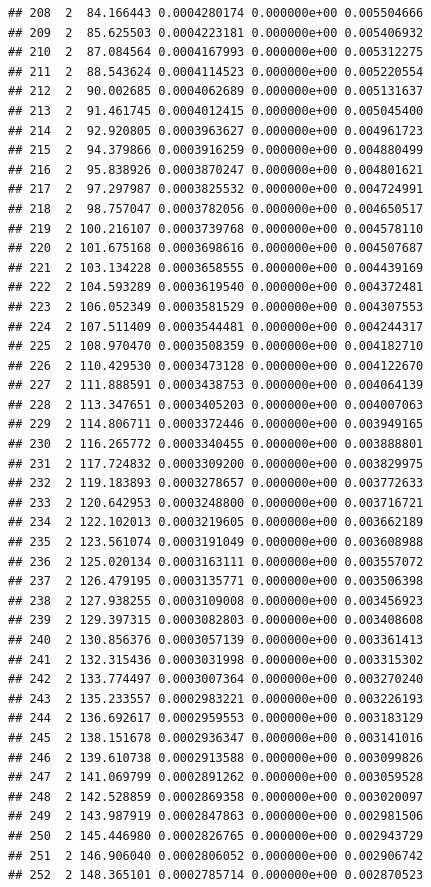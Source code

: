 \documentclass[article]{jss}\usepackage[]{graphicx}\usepackage[]{xcolor}
\makeatletter
\newenvironment{kframe}{%
 \def\at@end@of@kframe{}%
 \ifinner\ifhmode%
  \def\at@end@of@kframe{\end{minipage}}%
  \begin{minipage}{\columnwidth}%
 \fi\fi%
 \def\FrameCommand##1{\hskip\@totalleftmargin \hskip-\fboxsep
 \colorbox{shadecolor}{##1}\hskip-\fboxsep
     \hskip-\linewidth \hskip-\@totalleftmargin \hskip\columnwidth}%
 \MakeFramed {\advance\hsize-\width
   \@totalleftmargin\z@ \linewidth\hsize
   \@setminipage}}%
 {\par\unskip\endMakeFramed%
 \at@end@of@kframe}
\newenvironment{knitrout}{}{} %
\makeatother
\begin{document}
\begin{knitrout}
\begin{kframe}
\begin{verbatim}
## 208  2  84.166443 0.0004280174 0.000000e+00 0.005504666
## 209  2  85.625503 0.0004223181 0.000000e+00 0.005406932
## 210  2  87.084564 0.0004167993 0.000000e+00 0.005312275
## 211  2  88.543624 0.0004114523 0.000000e+00 0.005220554
## 212  2  90.002685 0.0004062689 0.000000e+00 0.005131637
## 213  2  91.461745 0.0004012415 0.000000e+00 0.005045400
## 214  2  92.920805 0.0003963627 0.000000e+00 0.004961723
## 215  2  94.379866 0.0003916259 0.000000e+00 0.004880499
## 216  2  95.838926 0.0003870247 0.000000e+00 0.004801621
## 217  2  97.297987 0.0003825532 0.000000e+00 0.004724991
## 218  2  98.757047 0.0003782056 0.000000e+00 0.004650517
## 219  2 100.216107 0.0003739768 0.000000e+00 0.004578110
## 220  2 101.675168 0.0003698616 0.000000e+00 0.004507687
## 221  2 103.134228 0.0003658555 0.000000e+00 0.004439169
## 222  2 104.593289 0.0003619540 0.000000e+00 0.004372481
## 223  2 106.052349 0.0003581529 0.000000e+00 0.004307553
## 224  2 107.511409 0.0003544481 0.000000e+00 0.004244317
## 225  2 108.970470 0.0003508359 0.000000e+00 0.004182710
## 226  2 110.429530 0.0003473128 0.000000e+00 0.004122670
## 227  2 111.888591 0.0003438753 0.000000e+00 0.004064139
## 228  2 113.347651 0.0003405203 0.000000e+00 0.004007063
## 229  2 114.806711 0.0003372446 0.000000e+00 0.003949165
## 230  2 116.265772 0.0003340455 0.000000e+00 0.003888801
## 231  2 117.724832 0.0003309200 0.000000e+00 0.003829975
## 232  2 119.183893 0.0003278657 0.000000e+00 0.003772633
## 233  2 120.642953 0.0003248800 0.000000e+00 0.003716721
## 234  2 122.102013 0.0003219605 0.000000e+00 0.003662189
## 235  2 123.561074 0.0003191049 0.000000e+00 0.003608988
## 236  2 125.020134 0.0003163111 0.000000e+00 0.003557072
## 237  2 126.479195 0.0003135771 0.000000e+00 0.003506398
## 238  2 127.938255 0.0003109008 0.000000e+00 0.003456923
## 239  2 129.397315 0.0003082803 0.000000e+00 0.003408608
## 240  2 130.856376 0.0003057139 0.000000e+00 0.003361413
## 241  2 132.315436 0.0003031998 0.000000e+00 0.003315302
## 242  2 133.774497 0.0003007364 0.000000e+00 0.003270240
## 243  2 135.233557 0.0002983221 0.000000e+00 0.003226193
## 244  2 136.692617 0.0002959553 0.000000e+00 0.003183129
## 245  2 138.151678 0.0002936347 0.000000e+00 0.003141016
## 246  2 139.610738 0.0002913588 0.000000e+00 0.003099826
## 247  2 141.069799 0.0002891262 0.000000e+00 0.003059528
## 248  2 142.528859 0.0002869358 0.000000e+00 0.003020097
## 249  2 143.987919 0.0002847863 0.000000e+00 0.002981506
## 250  2 145.446980 0.0002826765 0.000000e+00 0.002943729
## 251  2 146.906040 0.0002806052 0.000000e+00 0.002906742
## 252  2 148.365101 0.0002785714 0.000000e+00 0.002870523

\end{verbatim}
\end{kframe}
\end{knitrout}
\end{document}
